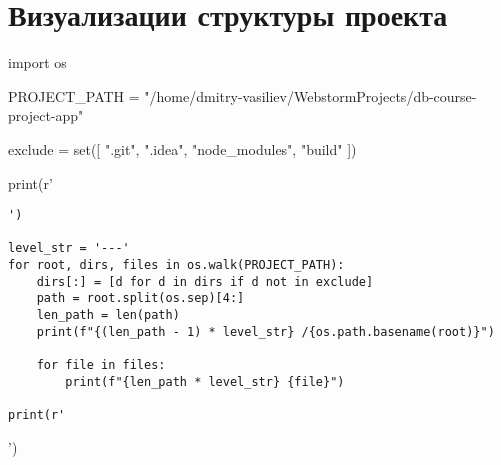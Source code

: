 \section{Визуализации структуры проекта}
\begin{pycode}
import os

PROJECT_PATH = "/home/dmitry-vasiliev/WebstormProjects/db-course-project-app"

exclude = set([
    ".git",
    ".idea",
    "node_modules",
    "build"
])

print(r'\begin{verbatim}')

level_str = '---'
for root, dirs, files in os.walk(PROJECT_PATH):
    dirs[:] = [d for d in dirs if d not in exclude]
    path = root.split(os.sep)[4:]
    len_path = len(path)
    print(f"{(len_path - 1) * level_str} /{os.path.basename(root)}")

    for file in files:
        print(f"{len_path * level_str} {file}")

print(r'\end{verbatim}')
\end{pycode}

\clearpage